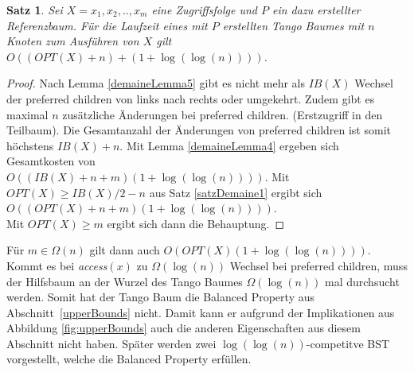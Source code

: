 \documentclass[a4paper,12pt]{article}
\newtheorem{Satz}{Satz}[section]
\begin{document}
\begin{Satz} \label{demaineSatz2}
	Sei $X = x_1, x_2,.., x_m$ eine Zugriffsfolge und $P$ ein dazu erstellter Referenzbaum. 
	Für die Laufzeit eines mit $P$ erstellten Tango Baumes mit $n$ Knoten zum Ausführen von $X$ gilt $O\left(\left(\mathit{OPT}\left(X\right) + n\right)  + \left(  1 + \log\left(\log \left(n\right)\right)\right)   \right)$.
\end{Satz}
\begin{proof}
	Nach Lemma \ref{demaineLemma5} gibt es nicht mehr als  $\mathit{IB}\left(X\right)$ Wechsel der preferred children von links nach rechts oder umgekehrt. Zudem gibt es maximal $n$ zusätzliche Änderungen bei preferred children. (Erstzugriff in den Teilbaum). Die Gesamtanzahl der Änderungen von preferred children ist somit höchstens $\mathit{IB}\left(X\right) + n$. Mit Lemma \ref{demaineLemma4} ergeben sich Gesamtkosten von\\ $O\left(\left(\mathit{IB}\left(X\right) + n +m \right) \left( 1 + \log \left(\log\left(n\right)\right)\right) \right)$. Mit $\mathit{OPT}\left(X\right) \geq \mathit{IB}\left(X\right) /2 -n $ aus Satz \ref{satzDemaine1} ergibt sich 
	$O\left(\left(\mathit{OPT}\left(X\right) + n +m \right) \left( 1 + \log \left(\log\left(n\right)\right)\right) \right)$.\\ Mit $\mathit{OPT}\left(X\right) \geq m$ ergibt sich dann die Behauptung.
\end{proof}
\noindent Für $m \in \Omega\left(n\right)$ gilt dann auch 
$O\left(	\mathit{OPT}\left(X\right) 	\left( 1 + \log \left(\log \left(n\right)\right)\right)	 \right)$.\\
 Kommt es bei \textit{access}$\left(x\right)$ zu $\Omega\left(\log\left(n\right)\right)$ Wechsel bei preferred children, muss der Hilfsbaum an der Wurzel des Tango Baumes $\Omega\left(\log\left(n\right)\right)$ mal durchsucht werden. Somit hat der Tango Baum die Balanced Property aus \mbox{Abschnitt \ref{upperBounds}} nicht. Damit kann er aufgrund der Implikationen aus Abbildung \ref{fig:upperBounds} auch die anderen Eigenschaften aus diesem Abschnitt nicht haben. Später werden zwei $\log\left(\log\left(n\right)\right)$-competitve BST vorgestellt, welche die Balanced Property erfüllen.      
\end{document}
